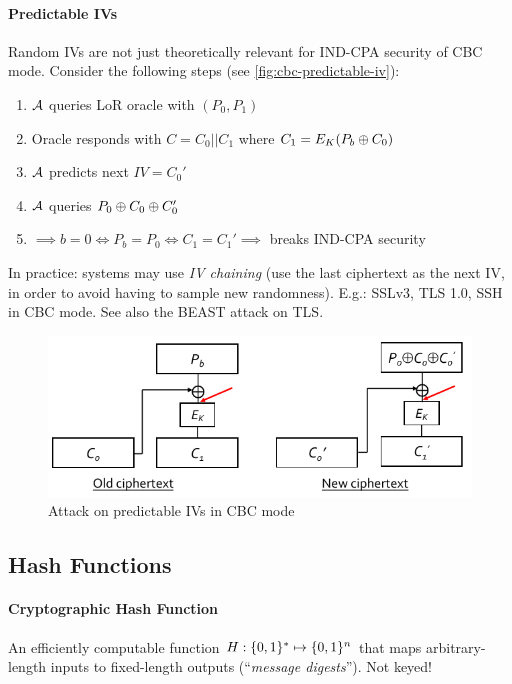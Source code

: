 \paragraph{Predictable IVs}
Random IVs are not just theoretically relevant for IND-CPA security of CBC mode.
Consider the following steps (see \autoref{fig:cbc-predictable-iv}):
\begin{enumerate}
\item $\mathcal{A}$ queries LoR oracle with $(P_0, P_1)$
\item Oracle responds with $C = C_0||C_1$ where $C_1 = E_K(P_b \oplus C_0)$
\item $\mathcal{A}$ predicts next $IV=C_0'$
\item $\mathcal{A}$ queries $P_0 \oplus C_0 \oplus C_0'$
\item $\implies b = 0 \iff P_b = P_0 \iff C_1 = C_1' \implies$ breaks IND-CPA security
\end{enumerate}

In practice: systems may use \emph{IV chaining} (use the last ciphertext as the next IV, in order to avoid having to sample new randomness).
E.g.: SSLv3, TLS 1.0, SSH in CBC mode.
See also the BEAST attack on TLS.

\begin{figure}[h]
    \centering
	\includegraphics[scale=0.6]{images/cbc-predictable-iv.png}
    \caption{Attack on predictable IVs in CBC mode}
    \label{fig:cbc-predictable-iv}
\end{figure}



\subsection{Hash Functions}

\paragraph{Cryptographic Hash Function}
An efficiently computable function $H: \lbrace 0, 1 \rbrace^* \mapsto \lbrace 0, 1 \rbrace^n$ that maps arbitrary-length inputs to fixed-length outputs (``\emph{message digests}'').
Not keyed!

